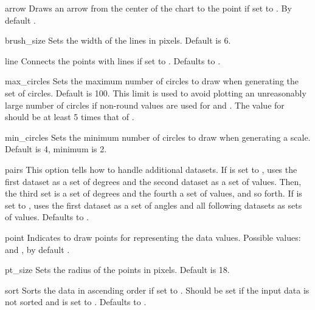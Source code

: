 \begin{AttrDecl}{arrow}
Draws an arrow from the center of the chart to the point if set to
. By default .
\end{AttrDecl}

\begin{AttrDecl}{brush\_size}
Sets the width of the lines in pixels. Default is 6.
\end{AttrDecl}

\begin{AttrDecl}{line}
Connects the points with lines if set to . Defaults to
.
\end{AttrDecl}

\begin{AttrDecl}{max\_circles}
Sets the maximum number of circles to draw when generating the set of
circles. Default is 100. This limit is used to avoid plotting an
unreasonably large number of circles if non-round values are used for
 and . The value for
 should be at least 5 times that of
.
\end{AttrDecl}

\begin{AttrDecl}{min\_circles}
Sets the minimum number of circles to draw when generating a scale.
Default is 4, minimum is 2.
\end{AttrDecl}

\begin{AttrDecl}{pairs}
This option tells \thisclass how to handle additional datasets. If
 is set to , \thisclass uses the first
dataset as a set of degrees and the second dataset as a set of values.
Then, the third set is a set of degrees and the fourth a set of values,
and so forth. If  is set to , \thisclass
uses the first dataset as a set of angles and all following datasets as
sets of values. Defaults to .
\end{AttrDecl}

\begin{AttrDecl}{point}
Indicates to draw points for representing the data values. Possible
values:  and , by default .
\end{AttrDecl}

\begin{AttrDecl}{pt\_size}
Sets the radius of the points in pixels. Default is 18.
\end{AttrDecl}

\begin{AttrDecl}{sort}
Sorts the data in ascending order if set to . Should be
set if the input data is not sorted and  is set to
. Defaults to .
\end{AttrDecl}
